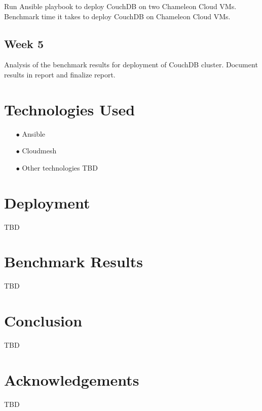 \documentclass[9pt,twocolumn,twoside]{../../styles/osajnl}
\begin{document}
Run Ansible playbook to deploy CouchDB on two Chameleon Cloud
VMs. Benchmark time it takes to deploy CouchDB on Chameleon Cloud VMs.

\subsection{Week 5}

Analysis of the benchmark results for deployment of CouchDB
cluster. Document results in report and finalize report.

\section{Technologies Used}
\begin{itemize}
\item[$\bullet$] Ansible
\item[$\bullet$] Cloudmesh
\item[$\bullet$] Other technologies TBD
\end{itemize}

\section{Deployment}
TBD

\section{Benchmark Results}
TBD

\section{Conclusion}
TBD
\section*{Acknowledgements}

TBD





 
\end{document}
